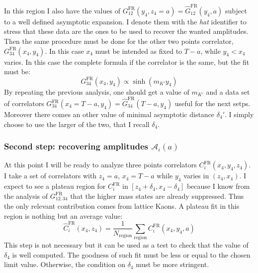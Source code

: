 \documentclass[english, LaM, oneside, noexaminfo]{sapthesis}
\begin{document}
In this region I also have the values of $G_{12}^\text{FR}(y_4,z_4=a) = \hat G_{12}^\text{FR}(y_4,a)$ subject to a well defined asymptotic expansion.
I denote them with the {\it hat} identifier to stress that these data are the ones to be used to recover the wanted amplitudes.
\newline
Then the same procedure must be done for the other two points correlator, $G_{34}^\text{FR}(x_4, y_4)$.
In this case $x_4$ must be intended as fixed to $T-a$, while $y_4 < x_4$ varies.
In this case the complete formula if the correlator is the same, but the fit must be:
\begin{equation*}
    G_{34}^\text{FR}(x_4, y_4) \propto \sinh \left( m_{K'} y_4 \right)
\end{equation*}
By repeating the previous analysis, one should get a value of $m_{K'}$ and a data set of correlators $G^\text{FR}_{34}(x_4=T-a,y_4) = \hat G^\text{FR}_{34}(T-a,y_4)$ useful for the next setps.
Moreover there comes an other value of minimal asymptotic distance $\delta_4'$.
I simply choose to use the larger of the two, that I recall $\delta_4$.

\subsubsection*{Second step: recovering amplitudes $\mathcal{A}_i(a)$}
\noindent
At this point I will be ready to analyze three points correlators $C_i^\text{FR}(x_4,y_4,z_4)$.
I take a set of correlators with $z_4 = a$, $x_4 = T-a$ while $y_4$ varies in $(z_4,x_4)$.
I expect to see a plateau region for $C_i^\text{FR}$ in $[z_4 + \delta_4 , x_4 - \delta_4]$ because I know from the analysis of $G^\text{FR}_{12,34}$ that the higher mass states are already suppressed.
Thus the only relevant contribution comes from lattice Kaons.
A plateau fit in this region is nothing but an average value:
\begin{equation*}
    \hat C_i^\text{FR}(x_4,z_4) = \frac{1}{N_\text{region}} \sum_\text{region} C_i^\text{FR}(x_4,y_4,a)
\end{equation*}
This step is not necessary but it can be used as a test to check that the value of $\delta_4$ is well computed.
The goodness of such fit must be less or equal to the chosen limit value.
Otherwise, the condition on $\delta_4$ must be more stringent.
\end{document}
